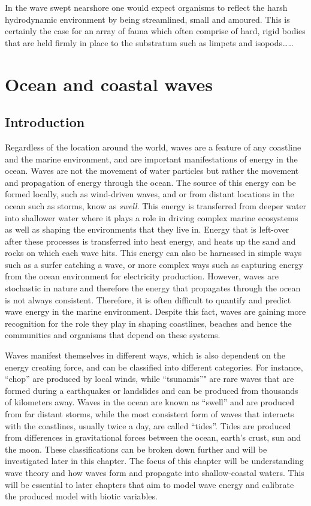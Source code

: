 \documentclass[
]{article}
\begin{document}
In the wave swept nearshore one would expect organisms to reflect the
harsh hydrodynamic environment by being streamlined, small and amoured.
This is certainly the case for an array of fauna which often comprise of
hard, rigid bodies that are held firmly in place to the substratum such
as limpets and isopods\ldots\ldots{}

\hypertarget{ocean-and-coastal-waves}{%
\section{Ocean and coastal waves}\label{ocean-and-coastal-waves}}

\hypertarget{introduction}{%
\subsection{Introduction}\label{introduction}}

Regardless of the location around the world, waves are a feature of any
coastline and the marine environment, and are important manifestations
of energy in the ocean. Waves are not the movement of water particles
but rather the movement and propagation of energy through the ocean. The
source of this energy can be formed locally, such as wind-driven waves,
and or from distant locations in the ocean such as storms, know as
\emph{swell}. This energy is transferred from deeper water into
shallower water where it plays a role in driving complex marine
ecosystems as well as shaping the environments that they live in. Energy
that is left-over after these processes is transferred into heat energy,
and heats up the sand and rocks on which each wave hits. This energy can
also be harnessed in simple ways such as a surfer catching a wave, or
more complex ways such as capturing energy from the ocean environment
for electricity production. However, waves are stochastic in nature and
therefore the energy that propagates through the ocean is not always
consistent. Therefore, it is often difficult to quantify and predict
wave energy in the marine environment. Despite this fact, waves are
gaining more recognition for the role they play in shaping coastlines,
beaches and hence the communities and organisms that depend on these
systems.

Waves manifest themselves in different ways, which is also dependent on
the energy creating force, and can be classified into different
categories. For instance, ``chop'' are produced by local winds, while
``tsunamis''" are rare waves that are formed during a earthquakes or
landslides and can be produced from thousands of kilometers away. Waves
in the ocean are known as ``swell'' and are produced from far distant
storms, while the most consistent form of waves that interacts with the
coastlines, usually twice a day, are called ``tides''. Tides are
produced from differences in gravitational forces between the ocean,
earth's crust, sun and the moon. These classifications can be broken
down further and will be investigated later in this chapter. The focus
of this chapter will be understanding wave theory and how waves form and
propagate into shallow-coastal waters. This will be essential to later
chapters that aim to model wave energy and calibrate the produced model
with biotic variables.
\end{document}
